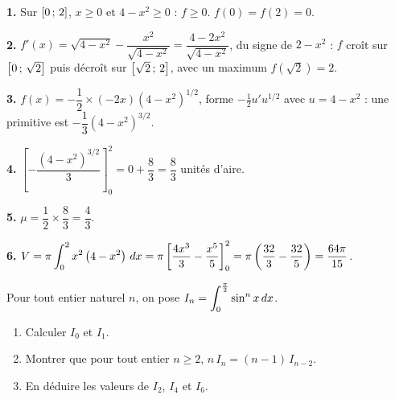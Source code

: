 \begin{corrige}
\textbf{1.} Sur $\left[0\,;\,2\right]$, $x \geq 0$ et $4-x^{2} \geq 0$ : $f \geq 0$.
$f(0) = f(2) = 0$.

\textbf{2.} $f'(x) = \sqrt{4-x^{2}} - \dfrac{x^{2}}{\sqrt{4-x^{2}}}
= \dfrac{4-2x^{2}}{\sqrt{4-x^{2}}}$, du signe de $2-x^{2}$ : $f$ croît sur
$\left[0\,;\,\sqrt2\right]$ puis décroît sur $\left[\sqrt2\,;\,2\right]$, avec un
maximum $f(\sqrt2) = 2$.

\textbf{3.} $f(x) = -\dfrac{1}{2}\times(-2x)\left(4-x^{2}\right)^{1/2}$, forme
$-\frac12 u'u^{1/2}$ avec $u = 4-x^{2}$ : une primitive est
$-\dfrac{1}{3}\left(4-x^{2}\right)^{3/2}$.

\textbf{4.} $\left[-\dfrac{(4-x^{2})^{3/2}}{3}\right]_{0}^{2} = 0 + \dfrac{8}{3}
= \dfrac{8}{3}$ unités d'aire.

\textbf{5.} $\mu = \dfrac{1}{2}\times\dfrac{8}{3} = \dfrac{4}{3}$.

\textbf{6.} $V = \pi\displaystyle\int_{0}^{2} x^{2}\left(4-x^{2}\right)\,dx
= \pi\left[\dfrac{4x^{3}}{3}-\dfrac{x^{5}}{5}\right]_{0}^{2}
= \pi\left(\dfrac{32}{3}-\dfrac{32}{5}\right) = \dfrac{64\pi}{15}$.
\end{corrige}

\begin{concours}
Pour tout entier naturel $n$, on pose
$\displaystyle I_{n} = \int_{0}^{\frac{\pi}{2}} \sin^{n}x \,dx$.

\begin{enumerate}[label=\textbf{\arabic*.}, leftmargin=*, itemsep=0.25em]
  \item Calculer $I_{0}$ et $I_{1}$.
  \item Montrer que pour tout entier $n \geq 2$,
        $n\,I_{n} = (n-1)\,I_{n-2}$.
  \item En déduire les valeurs de $I_{2}$, $I_{4}$ et $I_{6}$.
\end{enumerate}
\end{concours}

